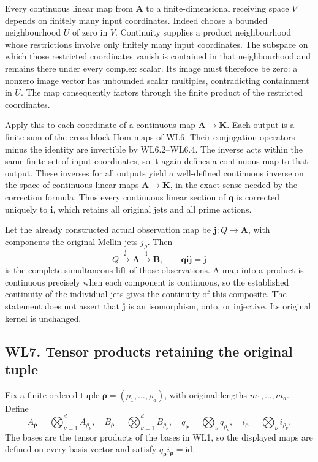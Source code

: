 Every continuous linear map from \(\mathbf A\) to a finite-dimensional
receiving space \(V\) depends on finitely many input coordinates. Indeed
choose a bounded neighbourhood \(U\) of zero in \(V\). Continuity
supplies a product neighbourhood whose restrictions involve only
finitely many input coordinates. The subspace on which those restricted
coordinates vanish is contained in that neighbourhood and remains there
under every complex scalar. Its image must therefore be zero: a nonzero
image vector has unbounded scalar multiples, contradicting containment
in \(U\). The map consequently factors through the finite product of the
restricted coordinates.

Apply this to each coordinate of a continuous map
\(\mathbf A\to\mathbf K\). Each output is a finite sum of the
cross-block Hom maps of WL6. Their conjugation operators minus the
identity are invertible by WL6.2--WL6.4. The inverse acts within the
same finite set of input coordinates, so it again defines a continuous
map to that output. These inverses for all outputs yield a well-defined
continuous inverse on the space of continuous linear maps
\(\mathbf A\to\mathbf K\), in the exact sense needed by the correction
formula. Thus every continuous linear section of \(\mathbf q\) is
corrected uniquely to \(\mathbf i\), which retains all original jets and
all prime actions.

Let the already constructed actual observation map be
\(\mathbf j:Q\to\mathbf A\), with components the original Mellin jets
\(j_\rho\). Then \[
 Q\xrightarrow{\mathbf j}\mathbf A
 \xrightarrow{\mathbf i}\mathbf B,\qquad
 \mathbf q\mathbf i\mathbf j=\mathbf j
\] is the complete simultaneous lift of those observations. A map into a
product is continuous precisely when each component is continuous, so
the established continuity of the individual jets gives the continuity
of this composite. The statement does not assert that \(\mathbf j\) is
an isomorphism, onto, or injective. Its original kernel is unchanged.

\subsection{WL7. Tensor products retaining the original
tuple}\label{wl7.-tensor-products-retaining-the-original-tuple}

Fix a finite ordered tuple \(\boldsymbol\rho=(\rho_1,\ldots,\rho_d)\),
with original lengths \(m_1,\ldots,m_d\). Define \[
 A_{\boldsymbol\rho}=\bigotimes_{\nu=1}^d A_{\rho_\nu},
 \quad
 B_{\boldsymbol\rho}=\bigotimes_{\nu=1}^d B_{\rho_\nu},
 \quad
 q_{\boldsymbol\rho}=\bigotimes_\nu q_{\rho_\nu},
 \quad
 i_{\boldsymbol\rho}=\bigotimes_\nu i_{\rho_\nu}.
\tag{WL7.1}
\] The bases are the tensor products of the bases in WL1, so the
displayed maps are defined on every basis vector and satisfy
\(q_{\boldsymbol\rho}i_{\boldsymbol\rho}=\mathrm{id}\).

